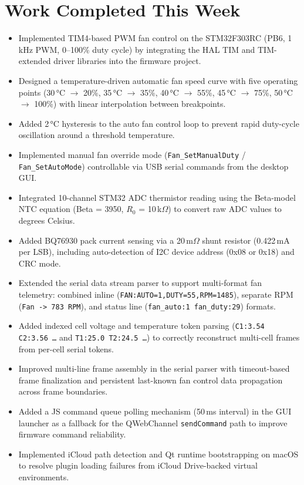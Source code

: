 \documentclass[12pt]{article}
\begin{document}
\section{Work Completed This Week}
\begin{itemize}[leftmargin=1cm]
    \item Implemented TIM4-based PWM fan control on the STM32F303RC (PB6, 1\,kHz PWM, 0--100\% duty cycle) by integrating the HAL TIM and TIM-extended driver libraries into the firmware project.
    \item Designed a temperature-driven automatic fan speed curve with five operating points (30\,°C $\rightarrow$ 20\%, 35\,°C $\rightarrow$ 35\%, 40\,°C $\rightarrow$ 55\%, 45\,°C $\rightarrow$ 75\%, 50\,°C $\rightarrow$ 100\%) with linear interpolation between breakpoints.
    \item Added 2\,°C hysteresis to the auto fan control loop to prevent rapid duty-cycle oscillation around a threshold temperature.
    \item Implemented manual fan override mode (\texttt{Fan\_SetManualDuty} / \texttt{Fan\_SetAutoMode}) controllable via USB serial commands from the desktop GUI.
    \item Integrated 10-channel STM32 ADC thermistor reading using the Beta-model NTC equation (Beta = 3950, $R_0$ = 10\,k$\Omega$) to convert raw ADC values to degrees Celsius.
    \item Added BQ76930 pack current sensing via a 20\,m$\Omega$ shunt resistor (0.422\,mA per LSB), including auto-detection of I2C device address (0x08 or 0x18) and CRC mode.
    \item Extended the serial data stream parser to support multi-format fan telemetry: combined inline (\texttt{FAN:AUTO=1,DUTY=55,RPM=1485}), separate RPM (\texttt{Fan -> 783 RPM}), and status line (\texttt{fan\_auto:1 fan\_duty:29}) formats.
    \item Added indexed cell voltage and temperature token parsing (\texttt{C1:3.54 C2:3.56\,\ldots} and \texttt{T1:25.0 T2:24.5\,\ldots}) to correctly reconstruct multi-cell frames from per-cell serial tokens.
    \item Improved multi-line frame assembly in the serial parser with timeout-based frame finalization and persistent last-known fan control data propagation across frame boundaries.
    \item Added a JS command queue polling mechanism (50\,ms interval) in the GUI launcher as a fallback for the QWebChannel \texttt{sendCommand} path to improve firmware command reliability.
    \item Implemented iCloud path detection and Qt runtime bootstrapping on macOS to resolve plugin loading failures from iCloud Drive-backed virtual environments.
\end{itemize}
\end{document}
